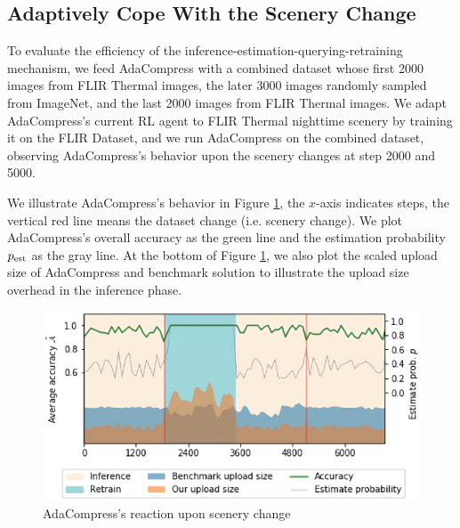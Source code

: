 \subsection{Adaptively Cope With the Scenery Change}

To evaluate the efficiency of the inference-estimation-querying-retraining mechanism, we feed AdaCompress with a combined dataset whose first 2000 images from FLIR Thermal images, the later 3000 images randomly sampled from ImageNet, and the last 2000 images from FLIR Thermal images. We adapt AdaCompress's current RL agent to FLIR Thermal nighttime scenery by training it on the FLIR Dataset, and we run AdaCompress on the combined dataset, observing AdaCompress's behavior upon the scenery changes at step 2000 and 5000. %

We illustrate AdaCompress's behavior in Figure \ref{fig: running-retrain}, the $ x $-axis indicates steps, the vertical red line means the dataset change (i.e. scenery change). We plot AdaCompress's overall accuracy as the green line and the estimation probability $ p_{\rm est} $ as the gray line. At the bottom of Figure \ref{fig: running-retrain}, we also plot the scaled upload size of AdaCompress and benchmark solution to illustrate the upload size overhead in the inference phase.


\begin{figure}[htbp]
    \includegraphics[width=\linewidth]{figures/running-retrain.eps}
    \caption{AdaCompress's reaction upon scenery change}
    \label{fig: running-retrain}
\end{figure}


